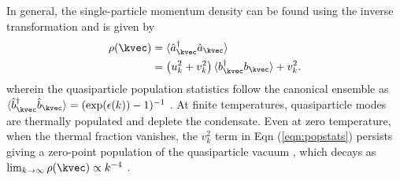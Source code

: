 	In general, the single-particle momentum density can be found using the inverse transformation and is given by
	 \begin{align}
	 \rho(\kvec) &= \langle\hat{a}_\kvec^\dagger\hat{a}_\kvec\rangle\\
		 &=\left(u_{k}^{2}+v_{k}^{2}\right)\langle b_{\kvec}^{\dagger}b_{\kvec}\rangle + v_{k}^{2}.
		 \label{eqn:popstats}
	 \end{align}
	wherein the quasiparticle population statistics follow the canonical ensemble as $\langle \hat{b}^\dagger_\kvec\hat{b}_\kvec\rangle = (\exp(\epsilon(k))-1)^{-1}$ \cite{PitaevskiiStringari,Chang16}.
	At finite temperatures, quasiparticle modes are thermally populated and deplete the condensate.
	 Even at zero temperature, when the thermal fraction vanishes, the $v_k^2$ term in Eqn (\ref{eqn:popstats}) persists giving a zero-point population of the quasiparticle vacuum \cite{Decamp18,Chang16}, which decays as $\lim_{k\rightarrow\infty}\rho(\kvec)\propto k^{-4}$ \cite{PethickSmith,PitaevskiiStringari,Chang16}.

